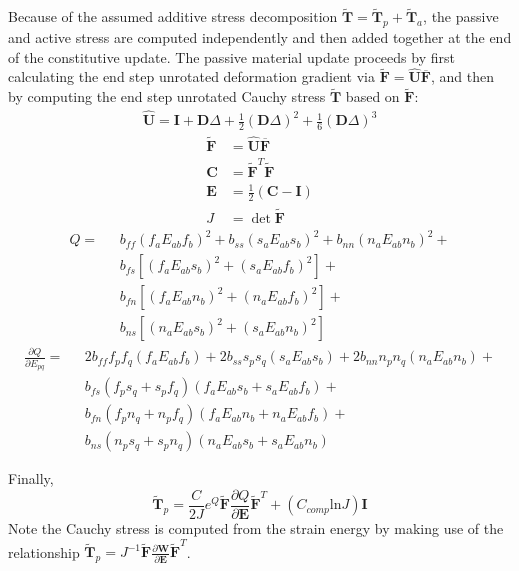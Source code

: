 Because of the assumed additive stress decomposition $\tilde{\bm{T}} = \tilde{\bm{T}}_p + \tilde{\bm{T}}_a$, the passive and active stress are computed independently and then added together at the end of the constitutive update. The passive material update proceeds by first calculating the end step unrotated deformation gradient via $\tilde{\bm{F}} = \hat{\bm{U}}\overline{\bm{F}}$, and then by computing the end step unrotated Cauchy stress $\tilde{\bm{T}}$ based on $\tilde{\bm{F}}$:
\begin{gather}
\hat{\bm{U}} = \bm{I} + \bm{D}\Delta + \frac{1}{2}(\bm{D}\Delta)^2 + \frac{1}{6}(\bm{D}\Delta)^3
\end{gather}
\begin{align}
\tilde{\bm{F}} &= \hat{\bm{U}}\overline{\bm{F}} \\
\bm{C} &= \tilde{\bm{F}}^T \tilde{\bm{F}} \\
\bm{E} &= \frac{1}{2}(\bm{C} - \bm{I}) \\
J  &= \det{\tilde{\bm{F}}}
\end{align}
\begin{equation}
\begin{aligned}
Q =\text{\ } &b_{ff}\left(f_aE_{ab}f_b\right)^2  + b_{ss}\left(s_aE_{ab}s_b\right)^2 + b_{nn}\left(n_aE_{ab}n_b\right)^2 +\\
& b_{fs}\left[\left(f_aE_{ab}s_b\right)^2 + \left(s_aE_{ab}f_b\right)^2\right] +\\
& b_{fn}\left[\left(f_aE_{ab}n_b\right)^2 + \left(n_aE_{ab}f_b\right)^2\right] +\\
& b_{ns}\left[\left(n_aE_{ab}s_b\right)^2 + \left(s_aE_{ab}n_b\right)^2\right]
\end{aligned}
\end{equation}
\begin{equation}
\begin{aligned}
\frac{\partial Q}{\partial E_{pq}} = \text{\ } &2b_{ff}f_pf_q\left(f_aE_{ab}f_b\right) + 2b_{ss}s_ps_q\left(s_aE_{ab}s_b\right) + 2b_{nn}n_pn_q\left(n_aE_{ab}n_b\right) +\\
& b_{fs}\left(f_ps_q + s_pf_q\right)\left(f_aE_{ab}s_b + s_aE_{ab}f_b\right) +\\
& b_{fn}\left(f_pn_q + n_pf_q\right)\left(f_aE_{ab}n_b + n_aE_{ab}f_b\right) +\\
& b_{ns}\left(n_ps_q + s_pn_q\right)\left(n_aE_{ab}s_b + s_aE_{ab}n_b\right)
\end{aligned}
\end{equation}

Finally,
\begin{equation}
\tilde{\bm{T}}_p = \frac{C}{2J}e^{Q}\tilde{\bm{F}}\frac{\partial{Q}}{\partial{\bm{E}}}\tilde{\bm{F}}^T + (C_{comp}\text{ln}J)\bm{I}
\end{equation}
Note the Cauchy stress is computed from the strain energy by making use of the relationship $\tilde{\bm{T}}_p = J^{-1}\tilde{\bm{F}}\frac{\partial\bm{W}}{\partial \bm{E}} \tilde{\bm{F}}^T$. 

